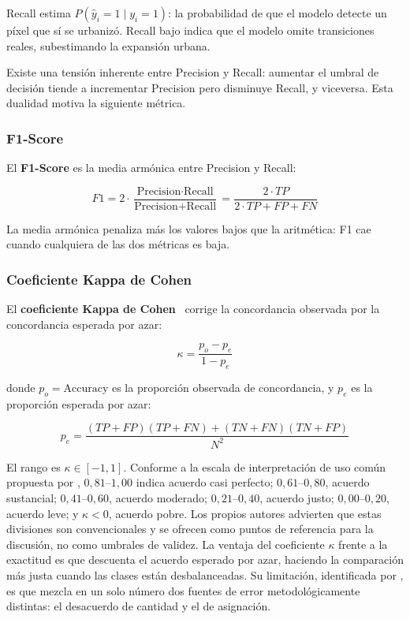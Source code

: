 Recall estima $P(\hat{y}_i = 1 \mid y_i = 1)$: la probabilidad de que el modelo detecte un píxel que sí se urbanizó. Recall bajo indica que el modelo omite transiciones reales, subestimando la expansión urbana.

Existe una tensión inherente entre Precision y Recall: aumentar el umbral de decisión tiende a incrementar Precision pero disminuye Recall, y viceversa. Esta dualidad motiva la siguiente métrica.

\subsubsection{F1-Score}

El \textbf{F1-Score} es la media armónica entre Precision y Recall:

\begin{equation}
F1 = 2 \cdot \frac{\text{Precision} \cdot \text{Recall}}{\text{Precision} + \text{Recall}} = \frac{2 \cdot TP}{2 \cdot TP + FP + FN}
\label{eq:f1}
\end{equation}

La media armónica penaliza más los valores bajos que la aritmética: F1 cae cuando cualquiera de las dos métricas es baja.

\subsubsection{Coeficiente Kappa de Cohen}

El \textbf{coeficiente Kappa de Cohen}~\parencite{Cohen1960} corrige la concordancia observada por la concordancia esperada por azar:

\begin{equation}
\kappa = \frac{p_o - p_e}{1 - p_e}
\label{eq:kappa}
\end{equation}

donde $p_o = \text{Accuracy}$ es la proporción observada de concordancia, y $p_e$ es la proporción esperada por azar:

\begin{equation}
p_e = \frac{(TP + FP)(TP + FN) + (TN + FN)(TN + FP)}{N^2}
\label{eq:pe}
\end{equation}

El rango es $\kappa \in [-1, 1]$. Conforme a la escala de interpretación de uso común propuesta por \textcite{LandisKoch1977}, $0{,}81$--$1{,}00$ indica acuerdo casi perfecto; $0{,}61$--$0{,}80$, acuerdo sustancial; $0{,}41$--$0{,}60$, acuerdo moderado; $0{,}21$--$0{,}40$, acuerdo justo; $0{,}00$--$0{,}20$, acuerdo leve; y $\kappa < 0$, acuerdo pobre. Los propios autores advierten que estas divisiones son convencionales y se ofrecen como puntos de referencia para la discusión, no como umbrales de validez. La ventaja del coeficiente $\kappa$ frente a la exactitud es que descuenta el acuerdo esperado por azar, haciendo la comparación más justa cuando las clases están desbalanceadas. Su limitación, identificada por \textcite{PontiusMillones2011}, es que mezcla en un solo número dos fuentes de error metodológicamente distintas: el desacuerdo de cantidad y el de asignación.

